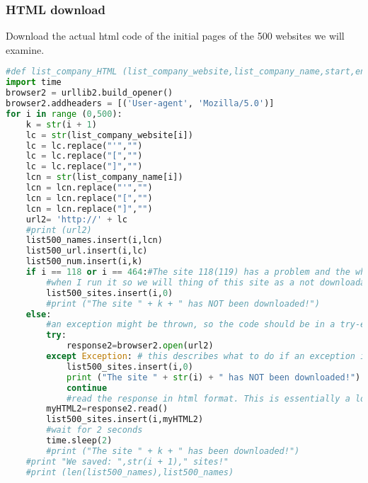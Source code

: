 \documentclass{article}
\begin{document}
\subsubsection{HTML download}
Download the actual html code of the initial pages of the 500 websites we will examine.
\begin{lstlisting}[language=Python]
#def list_company_HTML (list_company_website,list_company_name,start,end):
import time
browser2 = urllib2.build_opener()
browser2.addheaders = [('User-agent', 'Mozilla/5.0')]
for i in range (0,500):
    k = str(i + 1)
    lc = str(list_company_website[i])
    lc = lc.replace("'","")
    lc = lc.replace("[","")
    lc = lc.replace("]","")
    lcn = str(list_company_name[i])
    lcn = lcn.replace("'","")
    lcn = lcn.replace("[","")
    lcn = lcn.replace("]","")
    url2= 'http://' + lc
    #print (url2)
    list500_names.insert(i,lcn)
    list500_url.insert(i,lc)
    list500_num.insert(i,k)
    if i == 118 or i == 464:#The site 118(119) has a problem and the whole code is stacking 
        #when I run it so we will thing of this site as a not downloadable
        list500_sites.insert(i,0)
        #print ("The site " + k + " has NOT been downloaded!")
    else:
        #an exception might be thrown, so the code should be in a try-except block
        try:
            response2=browser2.open(url2)
        except Exception: # this describes what to do if an exception is thrown
            list500_sites.insert(i,0)
            print ("The site " + str(i) + " has NOT been downloaded!") 
            continue     
            #read the response in html format. This is essentially a long piece of text
        myHTML2=response2.read()
        list500_sites.insert(i,myHTML2)
        #wait for 2 seconds
        time.sleep(2)
        #print ("The site " + k + " has been downloaded!")    
    #print "We saved: ",str(i + 1)," sites!"
    #print (len(list500_names),list500_names)
\end{lstlisting}
\end{document}
